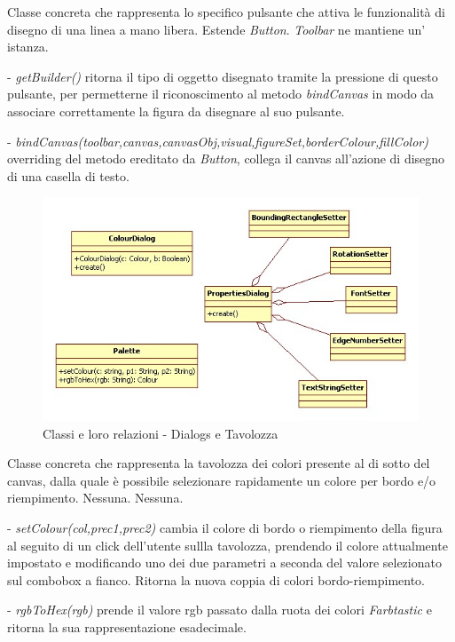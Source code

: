 Classe concreta che rappresenta lo specifico pulsante che attiva le funzionalit\` a di disegno di una linea a mano libera.
Estende \textit{Button}.
\textit{Toolbar} ne mantiene un' istanza.
\begin{elencopuntato}[\subsubsecindent]
\item[-] \textit{getBuilder()} ritorna il tipo di oggetto disegnato tramite la pressione di questo pulsante, per permetterne il riconoscimento al metodo \textit{bindCanvas} in modo da associare correttamente la figura da disegnare al suo pulsante.
\item[-]  \textit{bindCanvas(toolbar,canvas,canvasObj,visual,figureSet,borderColour,fillColor)} overriding del metodo ereditato da \textit{Button}, collega il canvas all'azione di disegno di una casella di testo. 
\end{elencopuntato}
\newpage
\begin{figure}[!ht]
\centering
\includegraphics[scale=0.7]{dialogs.jpg}
\caption{Classi e loro relazioni - Dialogs e Tavolozza}
\end{figure}

Classe concreta che rappresenta la tavolozza dei colori presente al di sotto del canvas, dalla quale \` e possibile selezionare rapidamente un colore per bordo e/o riempimento.
Nessuna.
Nessuna.
\begin{elencopuntato}[\subsubsecindent]
\item[-]  \textit{setColour(col,prec1,prec2)} cambia il colore di bordo o riempimento della figura al seguito di un click dell'utente sullla tavolozza, prendendo il colore attualmente impostato e modificando uno dei due parametri a seconda del valore selezionato sul combobox a fianco. Ritorna la nuova coppia di colori bordo-riempimento.
\item[-]  \textit{rgbToHex(rgb)} prende il valore rgb passato dalla ruota dei colori \textit{Farbtastic} e ritorna la sua rappresentazione esadecimale.
\end{elencopuntato}

